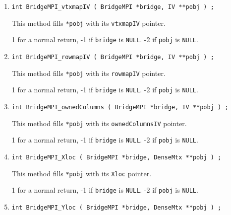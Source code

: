 \begin{enumerate}
\item
\begin{verbatim}
int BridgeMPI_vtxmapIV ( BridgeMPI *bridge, IV **pobj ) ;
\end{verbatim}
This method fills \texttt{*pobj} with its \texttt{vtxmapIV} pointer.
\par {}
1 for a normal return, 
-1 if \texttt{bridge} is \texttt{NULL}.
-2 if \texttt{pobj} is \texttt{NULL}.
\item
\begin{verbatim}
int BridgeMPI_rowmapIV ( BridgeMPI *bridge, IV **pobj ) ;
\end{verbatim}
This method fills \texttt{*pobj} with its \texttt{rowmapIV} pointer.
\par {}
1 for a normal return, 
-1 if \texttt{bridge} is \texttt{NULL}.
-2 if \texttt{pobj} is \texttt{NULL}.
\item
\begin{verbatim}
int BridgeMPI_ownedColumns ( BridgeMPI *bridge, IV **pobj ) ;
\end{verbatim}
This method fills \texttt{*pobj} with its \texttt{ownedColumnsIV} 
pointer.
\par {}
1 for a normal return, 
-1 if \texttt{bridge} is \texttt{NULL}.
-2 if \texttt{pobj} is \texttt{NULL}.
\item
\begin{verbatim}
int BridgeMPI_Xloc ( BridgeMPI *bridge, DenseMtx **pobj ) ;
\end{verbatim}
This method fills \texttt{*pobj} with its \texttt{Xloc} pointer.
\par {}
1 for a normal return, 
-1 if \texttt{bridge} is \texttt{NULL}.
-2 if \texttt{pobj} is \texttt{NULL}.
\item
\begin{verbatim}
int BridgeMPI_Yloc ( BridgeMPI *bridge, DenseMtx **pobj ) ;
\end{verbatim}

\end{enumerate}
